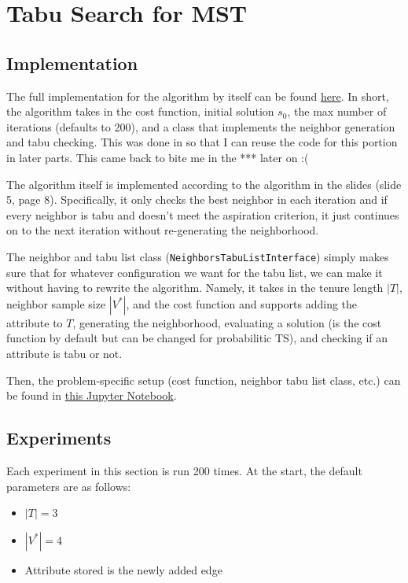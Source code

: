 \section{Tabu Search for MST}

\subsection{Implementation}

The full implementation for the algorithm by itself can be found \href{https://github.com/nngerncham/ma395_heuristic/blob/main/homework/hw3/codebase/tabu_search/algorithm.py}{here}. In short, the algorithm takes in the cost function, initial solution \(s_0\), the max number of iterations (defaults to 200), and a class that implements the neighbor generation and tabu checking. This was done in so that I can reuse the code for this portion in later parts. This came back to bite me in the *** later on :(

The algorithm itself is implemented according to the algorithm in the slides (slide 5, page 8). Specifically, it only checks the best neighbor in each iteration and if every neighbor is tabu and doesn't meet the aspiration criterion, it just continues on to the next iteration without re-generating the neighborhood.

The neighbor and tabu list class (\texttt{NeighborsTabuListInterface}) simply makes sure that for whatever configuration we want for the tabu list, we can make it without having to rewrite the algorithm. Namely, it takes in the tenure length \(|T|\), neighbor sample size \(|V^*|\), and the cost function and supports adding the attribute to \(T\), generating the neighborhood, evaluating a solution (is the cost function by default but can be changed for probabilitic TS), and checking if an attribute is tabu or not.

Then, the problem-specific setup (cost function, neighbor tabu list class, etc.) can be found in \href{https://github.com/nngerncham/ma395_heuristic/blob/main/homework/hw3/codebase/Notebooks/Problem\%201.ipynb}{this Jupyter Notebook}.

\subsection{Experiments}

Each experiment in this section is run 200 times. At the start, the default parameters are as follows:
\begin{itemize}
    \item \(|T| = 3\)
    \item \(|V^*| = 4\)
    \item Attribute stored is the newly added edge
\end{itemize}

